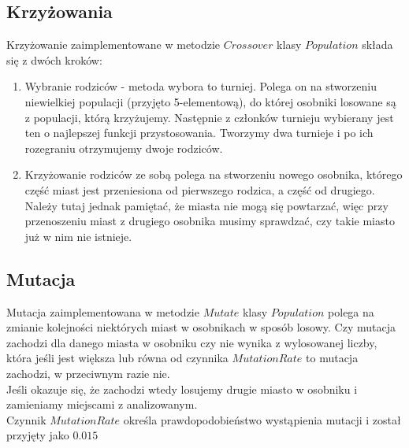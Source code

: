 \documentclass[11pt]{article}
\begin{document}
\subsection{Krzyżowania}
Krzyżowanie zaimplementowane w metodzie $Crossover$ klasy $Population$ składa się z dwóch kroków:
\begin{enumerate}
\item Wybranie rodziców - metoda wybora to turniej. Polega on na stworzeniu niewielkiej populacji (przyjęto 5-elementową), do której osobniki losowane są z populacji, którą krzyżujemy. Następnie z członków turnieju wybierany jest ten o najlepszej funkcji przystosowania. Tworzymy dwa turnieje i po ich rozegraniu otrzymujemy dwoje rodziców.
\item Krzyżowanie rodziców ze sobą polega na stworzeniu nowego osobnika, którego część miast jest przeniesiona od pierwszego rodzica, a część od drugiego. Należy tutaj jednak pamiętać, że miasta nie mogą się powtarzać, więc przy przenoszeniu miast z drugiego osobnika musimy sprawdzać, czy takie miasto już w nim nie istnieje.
\end{enumerate}

\subsection{Mutacja}
Mutacja zaimplementowana w metodzie $Mutate$ klasy $Population$ polega na zmianie kolejności niektórych miast w osobnikach w sposób losowy. Czy mutacja zachodzi dla danego miasta w osobniku czy nie wynika z wylosowanej liczby, która jeśli jest większa lub równa od czynnika $MutationRate$ to mutacja zachodzi, w przeciwnym razie nie.\\
Jeśli okazuje się, że zachodzi wtedy losujemy drugie miasto w osobniku i zamieniamy miejscami z analizowanym.\\
Czynnik $MutationRate$ określa prawdopodobieństwo wystąpienia mutacji i został przyjęty jako $0.015$
\end{document}
